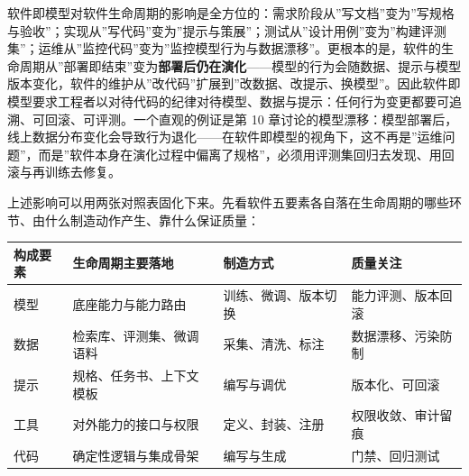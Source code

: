 \documentclass[12pt,a4paper,twoside,openany]{ctexbook}
\numberwithin{figure}{chapter}
\numberwithin{table}{chapter}
\newcounter{none}
\begin{document}
软件即模型对软件生命周期的影响是全方位的：需求阶段从''写文档''变为''写规格与验收''；实现从''写代码''变为''提示与策展''；测试从''设计用例''变为''构建评测集''；运维从''监控代码''变为''监控模型行为与数据漂移''。更根本的是，软件的生命周期从''部署即结束''变为\textbf{部署后仍在演化}------模型的行为会随数据、提示与模型版本变化，软件的维护从''改代码''扩展到''改数据、改提示、换模型''。因此软件即模型要求工程者以对待代码的纪律对待模型、数据与提示：任何行为变更都要可追溯、可回滚、可评测。一个直观的例证是第
10
章讨论的模型漂移：模型部署后，线上数据分布变化会导致行为退化------在软件即模型的视角下，这不再是''运维问题''，而是''软件本身在演化过程中偏离了规格''，必须用评测集回归去发现、用回滚与再训练去修复。

上述影响可以用两张对照表固化下来。先看软件五要素各自落在生命周期的哪些环节、由什么制造动作产生、靠什么保证质量：

{\def\LTcaptype{none} %
\begin{longtable}[]{@{}
  >{\raggedright\arraybackslash}p{}
  >{\raggedright\arraybackslash}p{}
  >{\raggedright\arraybackslash}p{}
  >{\raggedright\arraybackslash}p{}@{}}
\toprule\noalign{}
\begin{minipage}[b]{\linewidth}\raggedright
构成要素
\end{minipage} & \begin{minipage}[b]{\linewidth}\raggedright
生命周期主要落地
\end{minipage} & \begin{minipage}[b]{\linewidth}\raggedright
制造方式
\end{minipage} & \begin{minipage}[b]{\linewidth}\raggedright
质量关注
\end{minipage} \\
\midrule\noalign{}
\endhead
\bottomrule\noalign{}
\endlastfoot
模型 & 底座能力与能力路由 & 训练、微调、版本切换 & 能力评测、版本回滚 \\
数据 & 检索库、评测集、微调语料 & 采集、清洗、标注 &
数据漂移、污染防制 \\
提示 & 规格、任务书、上下文模板 & 编写与调优 & 版本化、可回滚 \\
工具 & 对外能力的接口与权限 & 定义、封装、注册 & 权限收敛、审计留痕 \\
代码 & 确定性逻辑与集成骨架 & 编写与生成 & 门禁、回归测试 \\
\end{longtable}
}
\end{document}
